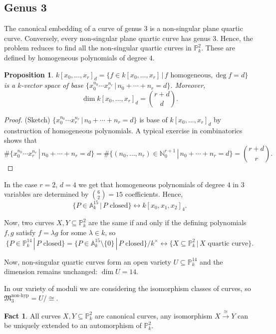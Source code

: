 \documentclass[12pt]{article}
\newtheorem*{proposition}{Proposition}
\theoremstyle{definition}
\newtheorem*{fact}{Fact}
\begin{document}
\subsection{Genus 3}

The canonical embedding of a curve of genus $3$ is a non-singular plane quartic curve. Conversely, every non-singular plane quartic curve has genus $3$. Hence, the problem reduces to find all the non-singular quartic curves in $\mathbb{P}_k^2$. These are defined by homogeneous polynomials of degree $4$.

\begin{proposition}
$k[x_0,\ldots,x_r]_d=\{f\in k[x_0,\ldots,x_r]\,|\,f\text{ homogeneous},\deg f=d\}$ is a $k$-vector space of base $\{x_0^{n_0}\cdots x_r^{n_r}\,|\,n_0+\cdots+n_r=d\}$. Moreover,
\[\dim k[x_0,\ldots,x_r]_d=\binom{r+d}{d}.\]
\end{proposition}

\begin{proof}
(Sketch) $\{x_0^{n_0}\cdots x_r^{n_r}\,|\,n_0+\cdots+n_r=d\}$ is base of $k[x_0,\ldots,x_r]_d$ by construction of homogeneous polynomials. A typical exercise in combinatorics shows that
\[\#\{x_0^{n_0}\cdots x_r^{n_r}\,|\,n_0+\cdots+n_r=d\}=\#\{(n_0,\ldots,n_r)\in\mathbb{N}_0^{r+1}\,|\,n_0+\cdots+n_r=d\}=\binom{r+d}{r}.\]
\end{proof}

In the case $r=2$, $d=4$ we get that homogeneous polynomials of degree $4$ in $3$ variables are determined by $\binom{6}{2}=15$ coefficients. Hence,
\[\{P\in\mathbb{A}_k^{15}\,|\,P\text{ closed}\}\longleftrightarrow k[x_0,x_1,x_2]_4.\]

Now, two curves $X,Y\subseteq\mathbb{P}_k^2$ are the same if and only if the defining polynomials $f,g$ satisfy $f=\lambda g$ for some $\lambda\in k$, so
\[\{P\in\mathbb{P}_k^{14}\,|\,P\text{ closed}\}=\{P\in\mathbb{A}_k^{15}\setminus\{0\}\,|\,P\text{ closed}\}\big/k^{\times}\longleftrightarrow\{X\subseteq\mathbb{P}_k^2\,|\,X\text{ quartic curve}\}.\]

Now, non-singular quartic curves form an open variety $U\subseteq\mathbb{P}_k^{14}$ and the dimension remains unchanged: $\dim U=14$.

In our variety of moduli we are considering the isomorphism classes of curves, so $\mathfrak{M}_3^{\text{non-hyp}}=U/\cong$.

\begin{fact}
All curves $X,Y\subseteq\mathbb{P}_k^2$ are canonical curves, any isomorphism $X\xrightarrow\cong Y$ can be uniquely extended to an automorphism of $\mathbb{P}_k^2$.
\end{fact}
\end{document}
